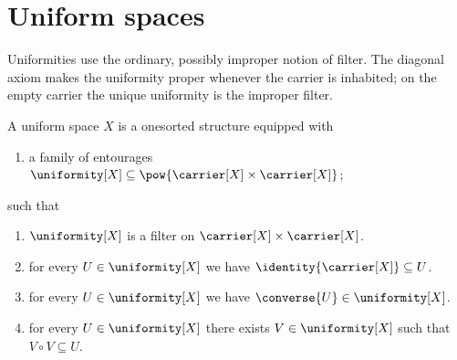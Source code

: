 



\section{Uniform spaces}

Uniformities use the ordinary, possibly improper notion of filter.  The
diagonal axiom makes the uniformity proper whenever the carrier is inhabited;
on the empty carrier the unique uniformity is the improper filter.

\begin{struct}\label{uniform_space}
    A uniform space $X$ is a onesorted structure equipped with
    \begin{enumerate}
        \item\label{uniformity_family}
            a family of entourages
            $\uniformity[X]\subseteq
                \pow{\carrier[X]\times\carrier[X]}$;
    \end{enumerate}
    such that
    \begin{enumerate}
        \item\label{uniformity_filter}
            $\uniformity[X]$ is a filter on
                $\carrier[X]\times\carrier[X]$.
        \item\label{uniformity_diagonal}
            for every $U\in\uniformity[X]$ we have
                $\identity{\carrier[X]}\subseteq U$.
        \item\label{uniformity_converse}
            for every $U\in\uniformity[X]$ we have
                $\converse{U}\in\uniformity[X]$.
        \item\label{uniformity_square}
            for every $U\in\uniformity[X]$ there exists
                $V\in\uniformity[X]$ such that
                $V\circ V\subseteq U$.
    \end{enumerate}
\end{struct}

